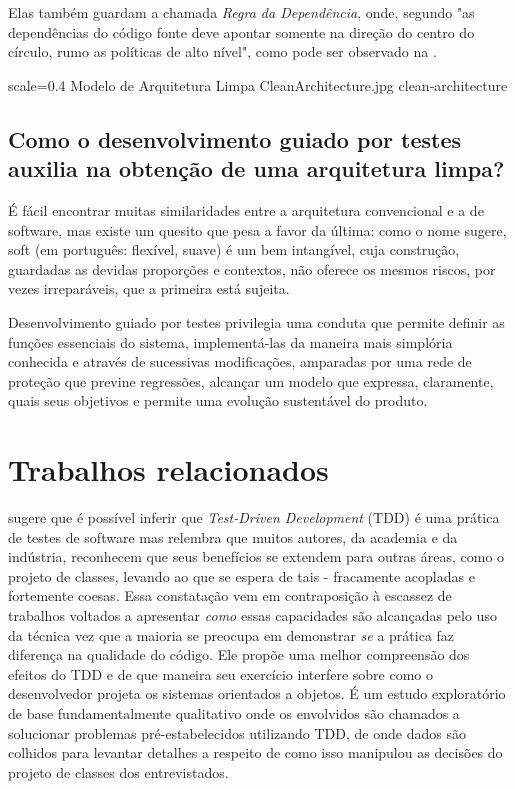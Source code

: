   Elas também guardam a chamada \emph{Regra da Dependência}, onde, segundo  "as dependências do código fonte deve apontar somente na direção do centro do círculo, rumo as políticas de alto nível", como pode ser observado na .

  \imagem
    {scale=0.4}
    {Modelo de Arquitetura Limpa}
    {CleanArchitecture.jpg}
    {clean-architecture}
    {\cite[pág. 197]{Martin2018}}

  \subsection{Como o desenvolvimento guiado por testes auxilia na obtenção de uma arquitetura limpa?}

    É fácil encontrar muitas similaridades entre a arquitetura convencional e a de software, mas existe um quesito que pesa a favor da última: como o nome sugere, soft (em português: flexível, suave) é um bem intangível, cuja construção, guardadas as devidas proporções e contextos, não oferece os mesmos riscos, por vezes irreparáveis, que a primeira está sujeita.

    Desenvolvimento guiado por testes privilegia uma conduta que permite definir as funções essenciais do sistema, implementá-las da maneira mais simplória conhecida e através de sucessivas modificações, amparadas por uma rede de proteção que previne regressões, alcançar um modelo que expressa, claramente, quais seus objetivos e permite uma evolução sustentável do produto.

\section{Trabalhos relacionados}

   sugere que é possível inferir que \emph{Test-Driven Development} (TDD) é uma prática de testes de software mas relembra que muitos autores, da academia e da indústria, reconhecem que seus benefícios se extendem para outras áreas, como o projeto de classes, levando ao que se espera de tais - fracamente acopladas e fortemente coesas. Essa constatação vem em contraposição à escassez de trabalhos voltados a apresentar \emph{como} essas capacidades são alcançadas pelo uso da técnica vez que a maioria se preocupa em demonstrar \emph{se} a prática faz diferença na qualidade do código. Ele propõe uma melhor compreensão dos efeitos do TDD e de que maneira seu exercício interfere sobre como o desenvolvedor projeta os sistemas orientados a objetos. É um estudo exploratório de base fundamentalmente qualitativo onde os envolvidos são chamados a solucionar problemas pré-estabelecidos utilizando TDD, de onde dados são colhidos para levantar detalhes a respeito de como isso manipulou as decisões do projeto de classes dos entrevistados.

